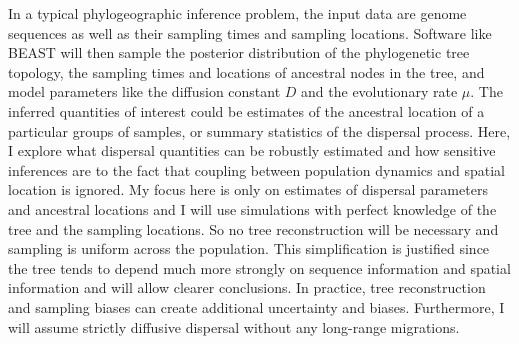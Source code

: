 \documentclass[aps,rmp, twocolumn]{revtex4}
\begin{document}
In a typical phylogeographic inference problem, the input data are genome sequences as well as their sampling times and sampling locations.
Software like BEAST will then sample the posterior distribution of the phylogenetic tree topology, the sampling times and locations of ancestral nodes in the tree, and model parameters like the diffusion constant $D$ and the evolutionary rate $\mu$.
The inferred quantities of interest could be estimates of the ancestral location of a particular groups of samples, or summary statistics of the dispersal process.
Here, I explore what dispersal quantities can be robustly estimated and how sensitive inferences are to the fact that coupling between population dynamics and spatial location is ignored.
My focus here is only on estimates of dispersal parameters and ancestral locations and I will use simulations with perfect knowledge of the tree and the sampling locations.
So no tree reconstruction will be necessary and sampling is uniform across the population.
This simplification is justified since the tree tends to depend much more strongly on sequence information and spatial information and will allow clearer conclusions.
In practice, tree reconstruction and sampling biases can create additional uncertainty and biases.
Furthermore, I will assume strictly diffusive dispersal without any long-range migrations.
\end{document}
